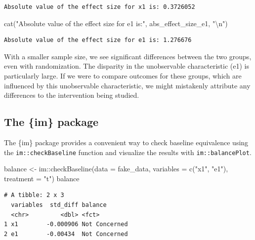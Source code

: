 \documentclass[
  letterpaper,
  DIV=11,
  numbers=noendperiod]{scrreprt}
\newenvironment{Shaded}{\begin{snugshade}}{\end{snugshade}}
\newcommand{\AttributeTok}[1]{\textcolor[rgb]{0.40,0.45,0.13}{#1}}
\newcommand{\FunctionTok}[1]{\textcolor[rgb]{0.28,0.35,0.67}{#1}}
\newcommand{\NormalTok}[1]{\textcolor[rgb]{0.00,0.23,0.31}{#1}}
\newcommand{\OtherTok}[1]{\textcolor[rgb]{0.00,0.23,0.31}{#1}}
\newcommand{\SpecialCharTok}[1]{\textcolor[rgb]{0.37,0.37,0.37}{#1}}
\newcommand{\StringTok}[1]{\textcolor[rgb]{0.13,0.47,0.30}{#1}}
\begin{document}
\begin{verbatim}
Absolute value of the effect size for x1 is: 0.3726052 
\end{verbatim}

\begin{Shaded}
\begin{Highlighting}[]
\FunctionTok{cat}\NormalTok{(}\StringTok{"Absolute value of the effect size for e1 is:"}\NormalTok{, abs\_effect\_size\_e1, }\StringTok{"}\SpecialCharTok{\textbackslash{}n}\StringTok{"}\NormalTok{)}
\end{Highlighting}
\end{Shaded}

\begin{verbatim}
Absolute value of the effect size for e1 is: 1.276676 
\end{verbatim}

With a smaller sample size, we see significant differences between the
two groups, even with randomization. The disparity in the unobservable
characteristic (e1) is particularly large. If we were to compare
outcomes for these groups, which are influenced by this unobservable
characteristic, we might mistakenly attribute any differences to the
intervention being studied.

\subsection{The \{im\} package}\label{the-im-package}

The \{im\} package provides a convenient way to check baseline
equivalence using the \texttt{im::checkBaseline} function and visualize
the results with \texttt{im::balancePlot}.

\begin{Shaded}
\begin{Highlighting}[]
\NormalTok{balance }\OtherTok{\textless{}{-}}
\NormalTok{  im}\SpecialCharTok{::}\FunctionTok{checkBaseline}\NormalTok{(}\AttributeTok{data =}\NormalTok{ fake\_data,}
                    \AttributeTok{variables =} \FunctionTok{c}\NormalTok{(}\StringTok{"x1"}\NormalTok{, }\StringTok{"e1"}\NormalTok{),}
                    \AttributeTok{treatment =} \StringTok{"t"}\NormalTok{)}
\NormalTok{balance}
\end{Highlighting}
\end{Shaded}

\begin{verbatim}
# A tibble: 2 x 3
  variables  std_diff balance      
  <chr>         <dbl> <fct>        
1 x1        -0.000906 Not Concerned
2 e1        -0.00434  Not Concerned
\end{verbatim}
\end{document}
